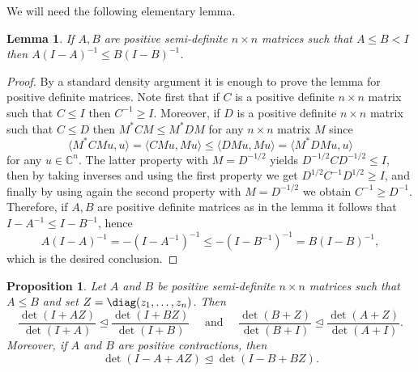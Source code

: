 \documentclass[10pt,reqno]{amsart}
\theoremstyle{plain}
\newtheorem{proposition}[theorem]{Proposition}
\newtheorem{lemma}[theorem]{Lemma}
\theoremstyle{definition}
\theoremstyle{remark}
\newcommand{\CC}{\mathbb{C}}
\begin{document}
We will need the following elementary lemma. 

\begin{lemma}\label{l-dado}
If $A,B$ are positive semi-definite $n \times n$ matrices such that 
$A\le B<I$ then $A(I-A)^{-1} \leq B(I-B)^{-1}$.
\end{lemma}

\begin{proof}
By a standard density argument it is enough to prove the lemma for
positive definite matrices. Note first that if $C$ is a positive definite
$n\times n$ matrix such that $C\le I$ then $C^{-1}\ge I$. Moreover, if $D$ is
a positive definite $n\times n$ matrix such that $C\le D$ then 
$M^* CM\le M^* DM$ for any $n\times n$ matrix $M$ since
$$\langle M^* CMu, u\rangle =\langle CMu,Mu\rangle\le \langle DMu,Mu\rangle=
\langle M^* DMu, u\rangle$$
for any $u\in\CC^n$. The latter property with $M=D^{-1/2}$ yields 
$D^{-1/2}CD^{-1/2}\le I$, then by taking inverses and using the first 
property we get $D^{1/2}C^{-1}D^{1/2}\ge I$, and finally by using again the
second property with $M=D^{-1/2}$ we obtain $C^{-1}\ge D^{-1}$. Therefore, 
if $A,B$ are
positive definite matrices as in the lemma it follows
that $I-A^{-1}\le I-B^{-1}$, hence
$$A(I-A)^{-1}=-\left(I-A^{-1}\right)^{-1}\le -\left(I-B^{-1}\right)^{-1}=
B(I-B)^{-1},
$$
which is the desired conclusion.
\end{proof}

\begin{proposition}\label{dado}
Let $A$ and $B$ be positive semi-definite $n \times n$ matrices such that 
$A \leq B$ and set $Z=\diag(z_1,\ldots,z_n)$. Then 
$$
\frac {\det(I+AZ)}{\det(I+A)} \unlhd \frac{\det(I+BZ)}{\det(I+B)} 
\quad \mbox{ and } \quad 
\frac {\det(B+Z)}{\det(B+I)} \unlhd \frac{\det(A+Z)}{\det(A+I)}. 
$$
Moreover, if $A$ and $B$ are positive contractions, then 
$$
\det(I-A+AZ) \unlhd \det(I-B+BZ).
$$
\end{proposition}
\end{document}
